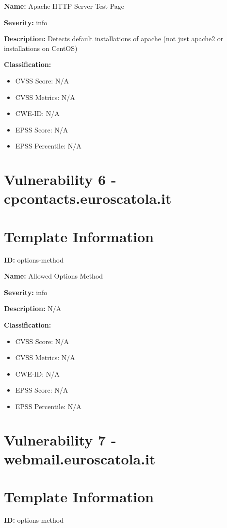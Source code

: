 \textbf{Name:} Apache HTTP Server Test Page

\textbf{Severity:} info

\textbf{Description:} Detects default installations of apache (not just apache2 or installations on CentOS)

\textbf{Classification:}
\begin{itemize}
\item CVSS Score: N/A
\item CVSS Metrics: N/A
\item CWE-ID: N/A
\item EPSS Score: N/A
\item EPSS Percentile: N/A
\end{itemize}



\section*{Vulnerability 6 - cpcontacts.euroscatola.it}

\section*{Template Information}
\textbf{ID:} options-method

\textbf{Name:} Allowed Options Method

\textbf{Severity:} info

\textbf{Description:} N/A

\textbf{Classification:}
\begin{itemize}
\item CVSS Score: N/A
\item CVSS Metrics: N/A
\item CWE-ID: N/A
\item EPSS Score: N/A
\item EPSS Percentile: N/A
\end{itemize}



\section*{Vulnerability 7 - webmail.euroscatola.it}

\section*{Template Information}
\textbf{ID:} options-method

